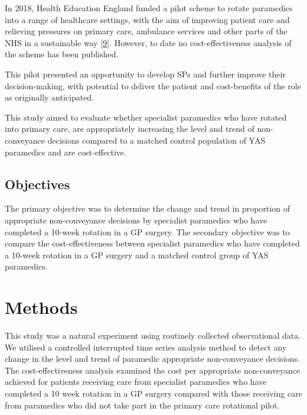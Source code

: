 \documentclass[
  a4paper,
  openany]{article}
\begin{document}
In 2018, Health Education England funded a pilot scheme to rotate paramedics into a range of healthcare settings, with the aim of improving patient care and relieving pressures on primary care, ambulance services and other parts of the NHS in a sustainable way {[}\protect\hyperlink{ref-turner_evaluation_2018}{9}{]}. However, to date no cost-effectiveness analysis of the scheme has been published.

This pilot presented an opportunity to develop SPs and further improve their decision-making, with potential to deliver the patient and cost-benefits of the role as originally anticipated.

This study aimed to evaluate whether specialist paramedics who have rotated into primary care, are appropriately increasing the level and trend of non-conveyance decisions compared to a matched control population of YAS paramedics and are cost-effective.

\hypertarget{objectives}{%
\subsection*{Objectives}\label{objectives}}

The primary objective was to determine the change and trend in proportion of appropriate non-conveyance decisions by specialist paramedics who have completed a 10-week rotation in a GP surgery. The secondary objective was to compare the cost-effectiveness between specialist paramedics who have completed a 10-week rotation in a GP surgery and a matched control group of YAS paramedics.

\hypertarget{methods-1}{%
\section*{Methods}\label{methods-1}}

This study was a natural experiment using routinely collected observational data. We utilised a controlled interrupted time series analysis method to detect any change in the level and trend of paramedic appropriate non-conveyance decisions. The cost-effectiveness analysis examined the cost per appropriate non-conveyance achieved for patients receiving care from specialist paramedics who have completed a 10 week rotation in a GP surgery compared with those receiving care from paramedics who did not take part in the primary care rotational pilot.
\end{document}
